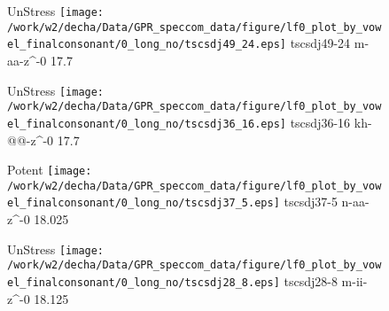 \documentclass{article}
\begin{document}
\begin{figure}[t]
\begin{minipage}[b]{.24\textwidth}
UnStress
\centering
\texttt{[image: /work/w2/decha/Data/GPR\_speccom\_data/figure/lf0\_plot\_by\_vowel\_finalconsonant/0\_long\_no/tscsdj49\_24.eps]}
tscsdj49-24 m-aa-z\textasciicircum-0 17.7
\end{minipage}
\begin{minipage}[b]{.24\textwidth}
UnStress
\centering
\texttt{[image: /work/w2/decha/Data/GPR\_speccom\_data/figure/lf0\_plot\_by\_vowel\_finalconsonant/0\_long\_no/tscsdj36\_16.eps]}
tscsdj36-16 kh-@@-z\textasciicircum-0 17.7
\end{minipage}
\begin{minipage}[b]{.24\textwidth}
\colorbox{Apricot}{Potent}
\centering
\texttt{[image: /work/w2/decha/Data/GPR\_speccom\_data/figure/lf0\_plot\_by\_vowel\_finalconsonant/0\_long\_no/tscsdj37\_5.eps]}
tscsdj37-5 n-aa-z\textasciicircum-0 18.025
\end{minipage}
\begin{minipage}[b]{.24\textwidth}
UnStress
\centering
\texttt{[image: /work/w2/decha/Data/GPR\_speccom\_data/figure/lf0\_plot\_by\_vowel\_finalconsonant/0\_long\_no/tscsdj28\_8.eps]}
tscsdj28-8 m-ii-z\textasciicircum-0 18.125
\end{minipage}
\end{figure}
\end{document}
